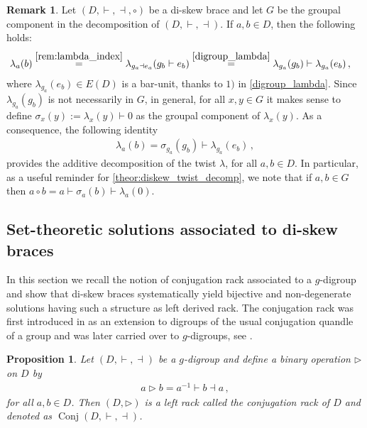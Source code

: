 \documentclass[preprint,1p]{elsarticle}
\numberwithin{equation}{section}
\newtheorem{prop}[theor]{Proposition}
\theoremstyle{definition}               %
\newtheorem{rem}[theor]{Remark}
\newcommand{\vd}{\vdash}
\newcommand{\dv}{\dashv}
\newcommand{\overeq}[1]{\overset{#1}{=}}
\DeclareMathOperator{\Conj}{Conj}
\begin{document}
\begin{rem}\label{rem:diskew_decomp}
    Let $(D, \vd, \dv, \circ)$ be a di-skew brace and let $G$ be the groupal component in the decomposition of $(D,\vd,\dv)$.
    If $a,b \in D$, then the following holds:
    \begin{align*}
        \lambda_a(b) &\overeq{\eqref{rem:lambda_index}}
        \lambda_{g_a \dv e_a}(g_b\vd e_b) \overeq{\eqref{digroup_lambda}}
        \lambda_{g_a}(g_b) \vd \lambda_{g_a}(e_b) \,,
    \end{align*}
    where $\lambda_{g_a}(e_b) \in E(D)$ is a bar-unit, thanks to $1)$ in \cref{digroup_lambda}.
    Since $\lambda_{g_a}(g_b)$ is not necessarily in $G$, in general, for all $x,y \in G$ it makes sense to define $\sigma_x(y) := \lambda_x(y) \vd 0$ as the groupal component of $\lambda_x(y)$.
    As a consequence, the following identity
    \begin{align*}
        \lambda_a(b) = \sigma_{g_a}(g_b) \vd \lambda_{g_a}(e_b) \,,
    \end{align*}
    provides the additive decomposition of the twist $\lambda$, for all $a,b \in D$.
    In particular, as a useful reminder for \cref{theor:diskew_twist_decomp}, we note that if $a,b \in G$ then $a \circ b = a \vd \sigma_a(b) \vd \lambda_a(0)$.
\end{rem}

\smallskip

\subsection{Set-theoretic solutions associated to di-skew braces}\label{SubSec:Sub-sol-di-skew_brace}

In this section we recall the notion of conjugation rack associated to a $g$-digroup and show that di-skew braces systematically yield bijective and non-degenerate solutions having such a structure as left derived rack.
The conjugation rack was first introduced in \cite{Kin07} as an extension to digroups of the usual conjugation quandle of a group and was later carried over to $g$-digroups, see \cite{Res24}.

\begin{prop}
    Let $(D,\vd,\dv)$ be a $g$-digroup and define a binary operation $\triangleright$ on $D$ by
    \begin{align*}
        a \triangleright b = a^{-1} \vd b \dv a \,,
    \end{align*}
    for all $a,b \in D$.
    Then $(D,\triangleright)$ is a \emph{left rack} called the \emph{conjugation rack} of $D$ and denoted as $\Conj(D,\vd,\dv)$.      
\end{prop}
\end{document}
